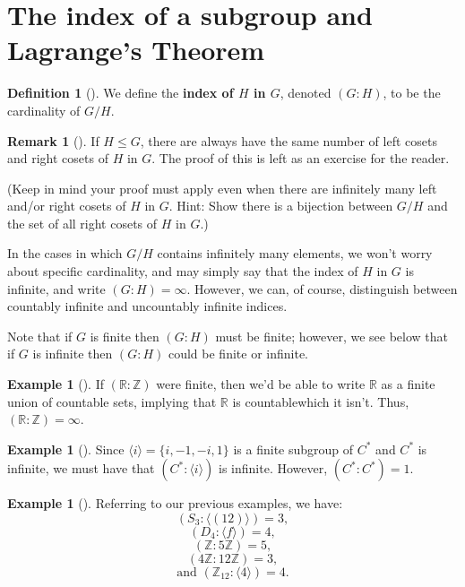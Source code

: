 \documentclass[10pt,openany,oneside]{book}
\newcommand{\terminology}[1]{\textbf{#1}}
\theoremstyle{plain}
\theoremstyle{definition}
\newtheorem{definition}[theorem]{Definition}
\theoremstyle{definition}
\newtheorem{remark}[theorem]{Remark}
\theoremstyle{definition}
\newtheorem{example}[theorem]{Example}
\theoremstyle{definition}
\numberwithin{equation}{section}
\def\Z{\mathbb{Z}}
\def\R{\mathbb{R}}
\begin{document}
\section[{The index of a subgroup and Lagrange's Theorem}]{The index of a subgroup and Lagrange's Theorem}\label{section-24}
\begin{definition}[{}]\label{definition-63}
\label{notation-73}
We define the \terminology{index of \(H\) in \(G\)}, denoted \((G:H)\), to be the cardinality of \(G/H\).%
\end{definition}
\begin{remark}[]\label{remark-41}
If \(H\leq G\), there are always have the same number of left cosets and right cosets of \(H\) in \(G\).  The proof of this is left as an exercise for the reader.%
\par
(Keep in mind your proof must apply even when there are infinitely many left and/or right cosets of \(H\) in \(G\).  Hint: Show there is a bijection between \(G/H\) and the set of all right cosets of \(H\) in \(G\).)%
\end{remark}
In the cases in which \(G/H\) contains infinitely many elements, we won't worry about specific cardinality, and may simply say that the index of \(H\) in \(G\) is infinite, and write \((G:H)=\infty\). However, we can, of course, distinguish between countably infinite and uncountably infinite indices.%
\par
Note that if \(G\) is finite then \((G:H)\) must be finite; however, we see below that if \(G\) is infinite then \((G:H)\) could be finite or infinite.%
\begin{example}[]\label{example-73}
If \((\R:\Z)\) were finite, then we'd be able to write \(\R\) as a finite union of countable sets, implying that \(\R\) is countable\textemdash{}which it isn't. Thus, \((\R:\Z)=\infty\).%
\end{example}
\begin{example}[]\label{example-74}
Since \(\langle i\rangle =\{i,-1,-i,1\}\) is a finite subgroup of \(C^*\) and \(C^*\) is infinite, we must have that \((C^*:\langle i\rangle )\) is infinite. However, \((C^*:C^*)=1\).%
\end{example}
\begin{example}[]\label{indices_ex}
Referring to our previous examples, we have: %
\begin{equation*}
(S_3:\langle (12)\rangle )=3,
\end{equation*}
%
\begin{equation*}
(D_4:\langle f\rangle )=4,
\end{equation*}
%
\begin{equation*}
(\Z:5\Z)=5,
\end{equation*}
%
\begin{equation*}
(4\Z:12\Z)=3,
\end{equation*}
%
\begin{equation*}
\text{and }(\Z_{12}:\langle 4\rangle )=4.
\end{equation*}
%
\end{example}
\end{document}
